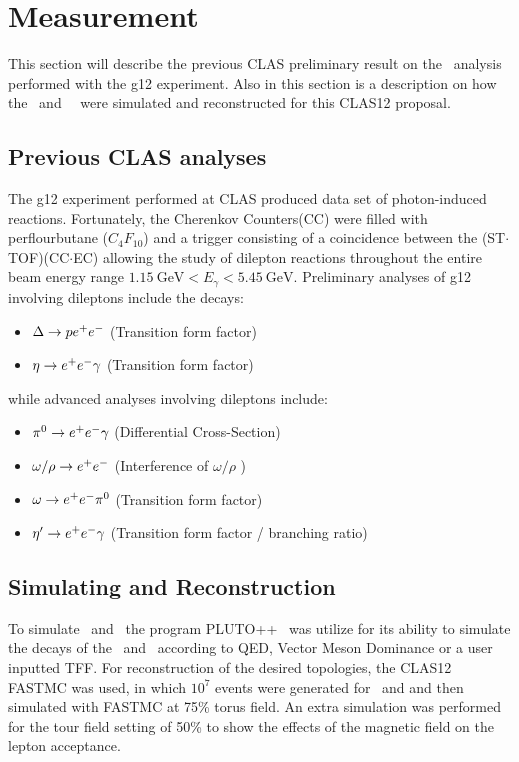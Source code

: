 \section{Measurement}\label{sec:measurement}
This section will describe the previous CLAS preliminary result on the \etaTP \ analysis performed with the g12 experiment. Also in this section is a description on how the \etaDal \ and \ \phiDal \ were simulated and reconstructed for this CLAS12 proposal.
\subsection{Previous CLAS analyses}
The g12 experiment performed at CLAS produced data set of photon-induced reactions. Fortunately, the Cherenkov Counters(CC) were filled with perflourbutane ($C_4F_{10}$) and a trigger consisting of a coincidence between the (ST$\cdot$TOF)(CC$\cdot$EC) allowing the study of dilepton reactions throughout the entire beam energy range $1.15 \ \mathrm{GeV}<E_\gamma <5.45 \ \mathrm{GeV}$. Preliminary analyses of g12 involving dileptons include the decays:
\begin{itemize}
\item $\Delta \to p e^+e^-$ (Transition form factor)
\item $\eta \to e^+e^- \gamma$ (Transition form factor)
\end{itemize}

while advanced analyses involving dileptons include:
\begin{itemize}
\item $\pi^{0} \to e^+e^- \gamma$ (Differential Cross-Section)
\item $\omega / \rho \to e^+e^-$ (Interference of $\omega/\rho$ )
\item $\omega \to e^+e^- \pi^{0}$ (Transition form factor)
\item $\eta^{\prime} \to e^+e^- \gamma$ (Transition form factor / branching ratio)
\end{itemize}
\subsection{Simulating and Reconstruction}
To simulate \etaPR \ and \phiPR \ the program PLUTO++~\cite{PLUTO} was utilize for its ability to simulate the decays of the \etaPDal \ and \phiDal \ according to QED, Vector Meson Dominance or a user inputted TFF. For reconstruction of the desired topologies, the CLAS12 FASTMC was used, in which $10^7$ events were generated for \etaPDal \ and \phiDal and then simulated with FASTMC at 75\% torus field. An extra simulation was performed for the tour field setting of 50\% to show the effects of the magnetic field on the lepton acceptance.
